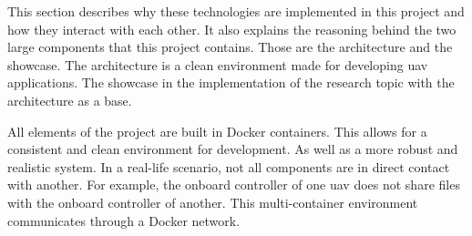 This section describes why these technologies are implemented in this project and how they interact with each other. It also explains the reasoning behind the two large components that this project contains. Those are the architecture and the showcase. The architecture is a clean environment made for developing \acs{uav} applications. The showcase in the implementation of the research topic with the architecture as a base.

All elements of the project are built in Docker containers. This allows for a consistent and clean environment for development. As well as a more robust and realistic system. In a real\hyp{}life scenario, not all components are in direct contact with another. For example, the onboard controller of one \acs{uav} does not share files with the onboard controller of another. This multi\hyp{}container environment communicates through a Docker network.